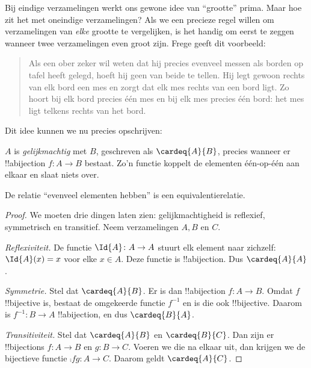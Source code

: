\documentclass[../../../include/open-logic-section]{subfiles}
\begin{document}


Bij eindige verzamelingen werkt ons gewone idee van ``grootte'' prima. Maar
hoe zit het met oneindige verzamelingen? Als we een precieze regel willen om
verzamelingen van \emph{elke} grootte te vergelijken, is het handig om
eerst te zeggen wanneer twee verzamelingen even groot zijn. Frege geeft dit voorbeeld:
\begin{quote}
  Als een ober zeker wil weten dat hij precies evenveel messen als borden op
  tafel heeft gelegd, hoeft hij geen van beide te tellen. Hij legt gewoon rechts
  van elk bord een mes en zorgt dat elk mes rechts van een bord ligt. Zo hoort
  bij elk bord precies één mes en bij elk mes precies één bord: het mes ligt
  telkens rechts van het bord. \citep[\S70]{Frege1884}
\end{quote}
Dit idee kunnen we nu precies opschrijven:

\begin{defn}
  $A$ is \emph{gelijkmachtig} met $B$, geschreven als $\cardeq{A}{B}$,
  precies wanneer er !!a{bijection} $f \colon A \to B$ bestaat. Zo'n functie
  koppelt de elementen één-op-één aan elkaar en slaat niets over.
\end{defn}

\begin{prop}
De relatie ``evenveel elementen hebben'' is een equivalentierelatie.
\end{prop}

\begin{proof} 
We moeten drie dingen laten zien: gelijkmachtigheid is reflexief, symmetrisch
en transitief. Neem verzamelingen $A, B$ en $C$.

\emph{Reflexiviteit.} De functie $\Id{A} \colon A \to A$ stuurt elk element
naar zichzelf: $\Id{A} (x) = x$ voor elke $x \in A$. Deze functie is
!!a{bijection}. Dus
$\cardeq{A}{A}$.

\emph{Symmetrie.} Stel dat $\cardeq{A}{B}$. Er is dan !!a{bijection}
$f\colon A \to B$. Omdat $f$ !!{bijective} is, bestaat de omgekeerde functie
$f^{-1}$ en is die ook !!{bijective}. Daarom is
$f^{-1}\colon B \to A$ !!a{bijection}, en dus $\cardeq{B}{A}$.

\emph{Transitiviteit.} Stel dat $\cardeq{A}{B}$ en $\cardeq{B}{C}$. Dan zijn
er !!{bijection}s $f\colon A \to B$ en $g\colon B \to C$. Voeren we die na
elkaar uit, dan krijgen we de bijectieve functie $\comp{f}{g}\colon A \to C$.
Daarom geldt $\cardeq{A}{C}$.
\end{proof}
\end{document}
